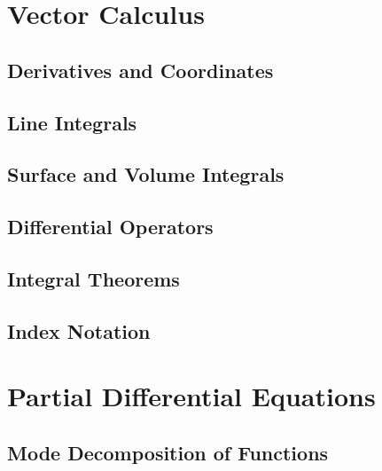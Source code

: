 \documentclass[a4paper,12pt]{report}
\begin{document}
\maketitle
\tableofcontents
\setcounter{section}{0}


\part{Vector Calculus}

\chapter{Derivatives and Coordinates}

\chapter{Line Integrals}     

\chapter{Surface and Volume Integrals}

\chapter{Differential Operators}

\chapter{Integral Theorems}

\chapter{Index Notation}


\part{Partial Differential Equations}

\chapter{Mode Decomposition of Functions}

\end{document}
